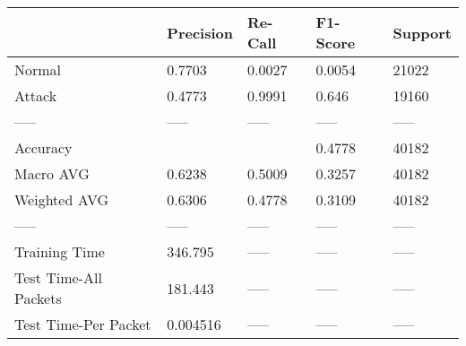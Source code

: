 \begin{tabular}{lllll}
\toprule
{} & Precision & Re-Call & F1-Score & Support \\
\midrule
Normal                &    0.7703 &  0.0027 &   0.0054 &   21022 \\
Attack                &    0.4773 &  0.9991 &    0.646 &   19160 \\
-----                 &     ----- &   ----- &    ----- &   ----- \\
Accuracy              &           &         &   0.4778 &   40182 \\
Macro AVG             &    0.6238 &  0.5009 &   0.3257 &   40182 \\
Weighted AVG          &    0.6306 &  0.4778 &   0.3109 &   40182 \\
-----                 &     ----- &   ----- &    ----- &   ----- \\
Training Time         &   346.795 &   ----- &    ----- &   ----- \\
Test Time-All Packets &   181.443 &   ----- &    ----- &   ----- \\
Test Time-Per Packet  &  0.004516 &   ----- &    ----- &   ----- \\
\bottomrule
\end{tabular}
